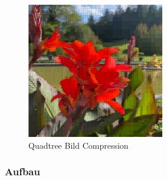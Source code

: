 \documentclass[11pt]{article}
\begin{document}
\begin{figure}[h]
    \begin{center}
    \includegraphics[width=6cm]{quadtreebildcompressionBlume.png}
    \caption{Quadtree Bild Compression}
    \label{quadtreeImageProcessing}
    
    \end{center}
    \end{figure}

\pagebreak

\subsubsection{Aufbau}
\end{document}
